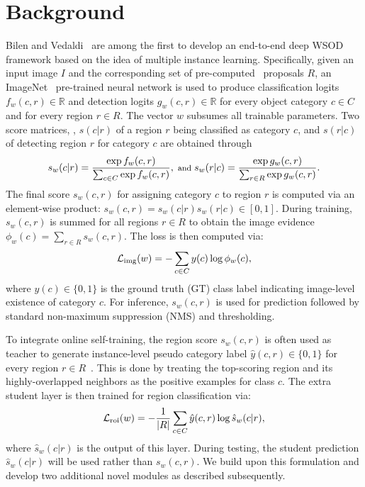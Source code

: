 \documentclass[10pt,twocolumn,letterpaper]{article}
\begin{document}
 \section{Background}
\label{bcakground}
Bilen and Vedaldi~\cite{Bilen16} are among the first to develop an end-to-end deep WSOD framework based on the idea of multiple instance learning. Specifically, given an input image $I$ and the corresponding set of pre-computed~\cite{ss, eb} proposals  $R$, an ImageNet~\cite{imagenet} pre-trained neural network is used to produce classification logits $f_w(c,r)\in\mathbb{R}$ and detection logits $g_w(c,r)\in\mathbb{R}$ for every object category $c\in C$ and for every region $r\in R$. The vector $w$ subsumes all trainable parameters. Two score matrices, \ie, $s(c|r)$ of a region $r$ being classified as category $c$, and $s(r|c)$ of detecting region $r$ for category $c$  are obtained through 
\begin{equation}
\footnotesize{
s_w(c|r) = \frac{\exp f_w(c,r)}{\sum_{c\in C}\exp f_w(c,r)}, \text{~and~}
s_w(r|c) = \frac{\exp g_w(c,r)}{\sum_{r\in R}\exp g_w(c,r)}.
}
\label{softmax}
\end{equation} 
The final score $s_w(c,r)$ for assigning category $c$ to region $r$ is computed via an element-wise product: $s_w(c,r) =  s_w(c|r)s_w(r|c) \in [0,1]$. During training, $s_w(c,r)$ is summed for all regions $r \in R$ to obtain the image evidence $\phi_w(c)=\sum_{r\in R}s_w(c,r)$. The loss is then computed via:
\begin{equation}
\footnotesize{
\mathcal{L}_\text{img}(w) = -\sum_{c\in C} y(c)\log\phi_w(c), 
\label{loss_img}}
\end{equation}
where $y(c)\in\{0,1\}$ is the ground truth (GT) class label indicating image-level existence of category $c$. For inference, $s_w(c,r)$ is used for prediction followed by standard non-maximum suppression (NMS) and thresholding.

To integrate online self-training, the region score $s_w(c,r)$ is often used as teacher to generate instance-level pseudo category label $\hat y(c,r) \in \{0,1\}$ for every region $r\in R$~\cite{tang2018pcl, c-mil, Gao_2019_ICCV, Zeng_2019_ICCV, TangWWYLHY18}. This is done by treating the top-scoring region and its highly-overlapped neighbors as the positive examples for class $c$. The extra student layer is then trained for region classification via:
\begin{equation}
\footnotesize{
\mathcal{L}_\text{roi}( w) = - \frac{1}{|R|} \sum_{c \in C} \hat{y}(c,r) \log {\hat s_w(c|r) },
\label{loss_roi}}
\end{equation}
where $\hat s_w(c|r) $ is the output of this layer. During testing, the student prediction $\hat s_w(c|r) $ will be used rather than $s_w(c,r)$. We build upon this formulation and develop two additional novel modules as described subsequently.
\end{document}
